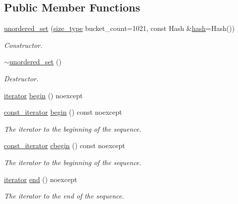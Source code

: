 \subsection*{Public Member Functions}
\begin{DoxyCompactItemize}
\item 
\hyperlink{classshad_1_1unordered__set_a05537f8a3c0c08af1910e2780b113f32}{unordered\-\_\-set} (\hyperlink{group__Types_gaf733341726e3097cf440257afa76d76a}{size\-\_\-type} bucket\-\_\-count=1021, const Hash \&\hyperlink{structshad_1_1hash}{hash}=Hash())
\begin{DoxyCompactList}\small\item\em Constructor. \end{DoxyCompactList}\item 
\hyperlink{classshad_1_1unordered__set_aa85876afdf2158838521bcaf4b270fa7}{$\sim$unordered\-\_\-set} ()
\begin{DoxyCompactList}\small\item\em Destructor. \end{DoxyCompactList}\item 
\hyperlink{group__Types_gadbad50ac069a38bd820c0a9f532f903e}{iterator} \hyperlink{group__Iterators_ga5ba277780850ab986e5ca0a86687ad23}{begin} () noexcept
\item 
\hyperlink{group__Types_ga074f67d0516c3a68d8c79976aef62fb1}{const\-\_\-iterator} \hyperlink{group__Iterators_ga7b0cf402ea13363d91f41500398bc169}{begin} () const noexcept
\begin{DoxyCompactList}\small\item\em The iterator to the beginning of the sequence. \end{DoxyCompactList}\item 
\hyperlink{group__Types_ga074f67d0516c3a68d8c79976aef62fb1}{const\-\_\-iterator} \hyperlink{group__Iterators_ga1b4c22820f74a086408bba4473e75fc8}{cbegin} () const noexcept
\begin{DoxyCompactList}\small\item\em The iterator to the beginning of the sequence. \end{DoxyCompactList}\item 
\hyperlink{group__Types_gadbad50ac069a38bd820c0a9f532f903e}{iterator} \hyperlink{group__Iterators_ga1c2adae7ef5d88a306b0fd64dcb0d6c0}{end} () noexcept
\begin{DoxyCompactList}\small\item\em The iterator to the end of the sequence. \end{DoxyCompactList}\item 

\end{DoxyCompactItemize}
